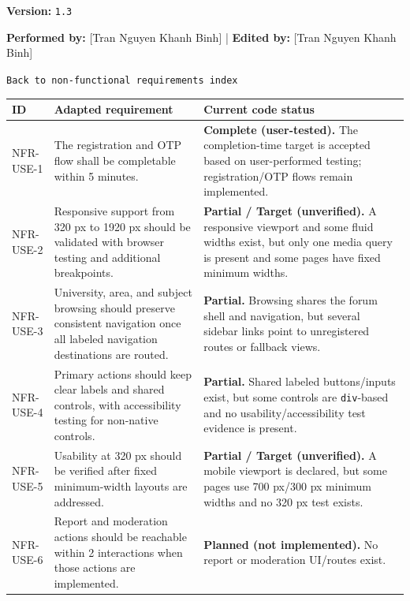\documentclass[12pt]{article}
\renewcommand{\baselinestretch}{1.5}
\begin{document}
\textbf{Version:} \texttt{1.3}
\par\medskip

\textbf{Performed by:} [Tran Nguyen Khanh Binh] | \textbf{Edited by:} [Tran Nguyen Khanh Binh]
\par\medskip

\texttt{Back to non-functional requirements index}
\par\medskip

\begingroup
\small
\renewcommand{\baselinestretch}{1.0}\selectfont
\renewcommand{\arraystretch}{1.15}
\setlength{\tabcolsep}{6pt}
\begin{longtable}{|>{\raggedright\arraybackslash}p{}|>{\raggedright\arraybackslash}p{}|>{\raggedright\arraybackslash}p{}|}
\hline
\textbf{ID} & \textbf{Adapted requirement} & \textbf{Current code status} \\ \hline
\endhead
NFR-USE-1 & The registration and OTP flow shall be completable within 5 minutes. & \textbf{Complete (user-tested).} The completion-time target is accepted based on user-performed testing; registration/OTP flows remain implemented. \\ \hline
NFR-USE-2 & Responsive support from 320 px to 1920 px should be validated with browser testing and additional breakpoints. & \textbf{Partial / Target (unverified).} A responsive viewport and some fluid widths exist, but only one media query is present and some pages have fixed minimum widths. \\ \hline
NFR-USE-3 & University, area, and subject browsing should preserve consistent navigation once all labeled navigation destinations are routed. & \textbf{Partial.} Browsing shares the forum shell and navigation, but several sidebar links point to unregistered routes or fallback views. \\ \hline
NFR-USE-4 & Primary actions should keep clear labels and shared controls, with accessibility testing for non-native controls. & \textbf{Partial.} Shared labeled buttons/inputs exist, but some controls are \texttt{div}-based and no usability/accessibility test evidence is present. \\ \hline
NFR-USE-5 & Usability at 320 px should be verified after fixed minimum-width layouts are addressed. & \textbf{Partial / Target (unverified).} A mobile viewport is declared, but some pages use 700 px/300 px minimum widths and no 320 px test exists. \\ \hline
NFR-USE-6 & Report and moderation actions should be reachable within 2 interactions when those actions are implemented. & \textbf{Planned (not implemented).} No report or moderation UI/routes exist. \\ \hline
\end{longtable}
\endgroup
\par\medskip
\end{document}
